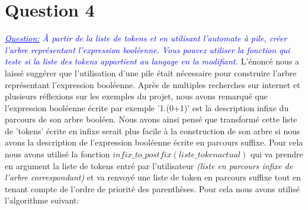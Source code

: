 \documentclass{article}
\begin{document}
\section*{Question 4}
\textit{
\textcolor{blue}{
\underline{Question:}
À partir de la liste de tokens et en utilisant l’automate à pile, créer l’arbre représentant l’expression booléenne. Vous pouvez utiliser la fonction qui teste si la liste des tokens appartient au langage en la modifiant.
}
}
\newline
\newline
L'énoncé nous a laissé suggérer que l'utilisation d'une pile était nécessaire pour construire l'arbre représentant l'expression booléenne. Après de multiples recherches sur internet et plusieurs réflexions sur les exemples du projet, nous avons remarqué que l'expression booléenne écrite par exemple '1.(0+1)' est la description infixe du parcours de son arbre booléen. Nous avons ainsi pensé que transformé cette liste de 'tokens' écrite en infixe serait plus facile à la construction de son arbre si nous avons la description de l'expression booléenne écrite en parcours suffixe. Pour cela nous avons utilisé la fonction \textit{$infix\_to\_postfix(liste\_token actual)$} qui va prendre en argument la liste de tokens entré par l'utilisateur \textit{(liste en parcours infixe de l'arbre correspondant)} et va renvoyé une liste de token en parcours suffixe tout en tenant compte de l'ordre de priorité des parenthèses. 
\newline\newline
Pour cela nous avons utilisé l'algorithme suivant:
\newline\newline
{}
\end{document}
